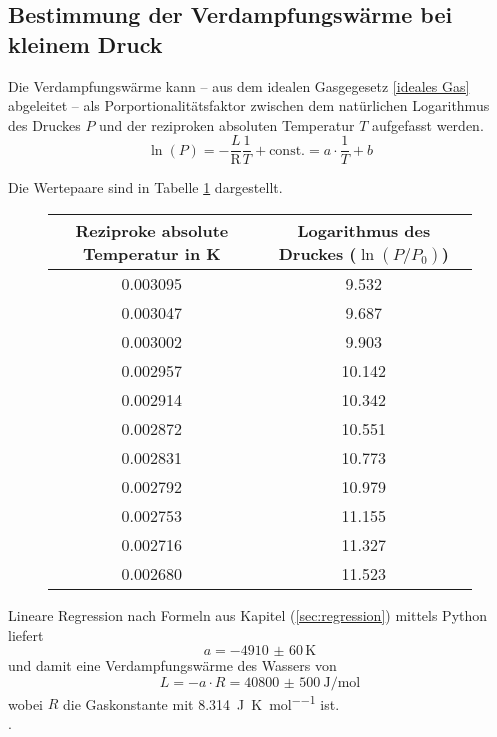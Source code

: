 \subsection{Bestimmung der Verdampfungswärme bei kleinem Druck}
\label{sec:bestimmungverdampfungswarme}
Die Verdampfungswärme kann -- aus dem idealen Gasgegesetz \eqref{ideales Gas} abgeleitet --  als Porportionalitätsfaktor zwischen dem natürlichen Logarithmus des Druckes $P$ und der reziproken absoluten Temperatur $T$ aufgefasst werden. 
\begin{equation}
\ln(P) = - \frac{L}{\text{R}} \frac{1}{T} + \text{const.} = a \cdot \frac{1}{T} +b
\end{equation}



Die Wertepaare sind in Tabelle \ref{tab:druck-temperatur} dargestellt.
\begin{figure}[h!]
	\centering
\begin{tabular}{c|c}
	Reziproke absolute Temperatur in \si{\kelvin}&   Logarithmus des Druckes ($\ln{(P/P_0)}$) \\
	\hline
	0.003095 &                   9.532 \\
	0.003047 &                   9.687 \\
	0.003002 &                   9.903 \\
	0.002957&                  10.142  \\
	0.002914 &                  10.342 \\
	0.002872 &                  10.551  \\
	0.002831 &                  10.773 \\
	0.002792 &                  10.979  \\
	0.002753 &                  11.155  \\
	0.002716 &                  11.327 \\
	0.002680&                  11.523 \\
\end{tabular}
\label{tab:druck-temperatur}
\end{figure}


Lineare Regression nach Formeln aus Kapitel (\ref{sec:regression}) mittels Python liefert
\begin{equation}
a= \num{-4910(60)} \, \si{\kelvin}
\end{equation}
und damit eine Verdampfungswärme des Wassers von
\begin{equation}
L = - a \cdot R = \SI{40800(500)}{\joule\per\mol} 
\end{equation}
wobei $R$ die Gaskonstante mit \SI{8.314}{\joule\per\kelvin\per\mol} ist. \\
.


